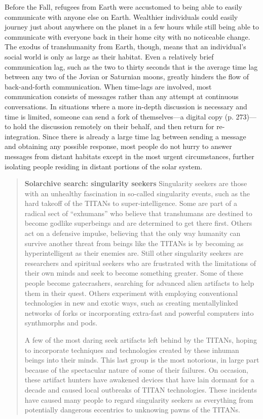 Before the Fall, refugees from Earth were accustomed to being able to easily communicate with anyone else on Earth. Wealthier individuals could easily journey just about anywhere on the planet in a few hours while still being able to communicate with everyone back in their home city with no noticeable change. The exodus of transhumanity from Earth, though, means that an individual's social world is only as large as their habitat. Even a relatively brief communication lag, such as the two to thirty seconds that is the average time lag between any two of the Jovian or Saturnian moons, greatly hinders the flow of back-and-forth communication. When time-lags are involved, most communication consists of messages rather than any attempt at continuous conversations. In situations where a more in-depth discussion is necessary and time is limited, someone can send a fork of themselves—a digital copy (p. 273)—to hold the discussion remotely on their behalf, and then return for re-integration. Since there is already a large time lag between sending a message and obtaining any possible response, most people do not hurry to answer messages from distant habitats except in the most urgent circumstances, further isolating people residing in distant portions of the solar system. 

\begin{quotation} \textbf{Solarchive search: singularity seekers} Singularity seekers are those with an unhealthy fascination in so-called singularity events, such as the hard takeoff of the TITANs to super-intelligence. Some are part of a radical sect of “exhumans” who believe that transhumans are destined to become godlike superbeings and are determined to get there first. Others act on a defensive impulse, believing that the only way humanity can survive another threat from beings like the TITANs is by becoming as hyperintelligent as their enemies are. Still other singularity seekers are researchers and spiritual seekers who are frustrated with the limitations of their own minds and seek to become something greater. Some of these people become gatecrashers, searching for advanced alien artifacts to help them in their quest. Others experiment with employing conventional technologies in new and exotic ways, such as creating mentallylinked networks of forks or incorporating extra-fast and powerful computers into synthmorphs and pods. 

A few of the most daring seek artifacts left behind by the TITANs, hoping to incorporate techniques and technologies created by these inhuman beings into their minds. This last group is the most notorious, in large part because of the spectacular nature of some of their failures. On occasion, these artifact hunters have awakened devices that have lain dormant for a decade and caused local outbreaks of TITAN technologies. These incidents have caused many people to regard singularity seekers as everything from potentially dangerous eccentrics to unknowing pawns of the TITANs. \end{quotation} 


